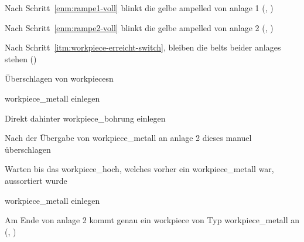     \begin{erwartung}
        \item Nach Schritt~\ref{enm:rampe1-voll} blinkt die gelbe \gls{ampelled}
        von \gls{anlage} 1 (, ) %
        \item Nach Schritt~\ref{enm:rampe2-voll} blinkt die gelbe \gls{ampelled}
        von \gls{anlage} 2 (, ) %
        \item Nach Schritt~\ref{itm:workpiece-erreicht-switch},
         bleiben die \glspl{belt} beider \glspl{anlage} stehen ()
    \end{erwartung}

    \begin{ablauf}{Überschlagen von \glspl{workpiece}n}
        \item \gls{workpiece_metall} einlegen
        \item Direkt dahinter \gls{workpiece_bohrung} einlegen
        \item Nach der Übergabe von \gls{workpiece_metall} an \gls{anlage} 2 dieses manuel überschlagen
        \item Warten bis das \gls{workpiece_hoch}, welches vorher ein \gls{workpiece_metall} war,
        aussortiert wurde
        \item \gls{workpiece_metall} einlegen
    \end{ablauf}

    \erwartungText
    Am Ende von \gls{anlage} 2 kommt genau ein \gls{workpiece} von Typ \gls{workpiece_metall} an (, )
